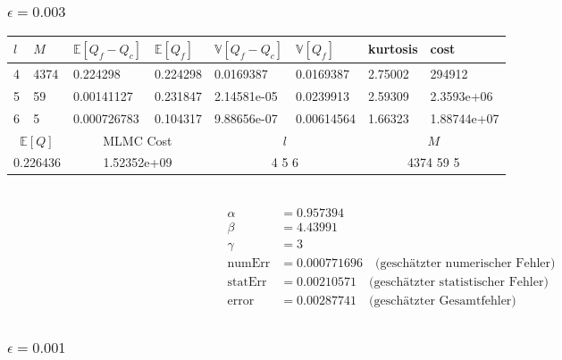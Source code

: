 \subsubsection{$ \epsilon=0.003 $}
\noindent\begin{tabular}{|p{0.15\q}|p{0.55\q}|p{1.4\q}|p{1.05\q}|p{1.35\q}|p{1.25\q}|p{0.9\q}|p{1.35\q}|}
	\hline
	$ l $   &  $ M $  &  $ \mathbb{E}[Q_f-Q_c] $  &   $ \mathbb{E}[Q_f] $ &  $ \mathbb{V}[Q_f-Q_c] $   &   $ \mathbb{V}[Q_f] $ &  kurtosis    &    cost\\
	\hline
	4 & 4374&    0.224298 &   0.224298&   0.0169387 &  0.0169387  &   2.75002 &     294912 \\
	5  &  59 & 0.00141127  &  0.231847 & 2.14581e-05 &  0.0239913  &   2.59309 & 2.3593e+06\\
	6   &  5  &0.000726783  &  0.104317 & 9.88656e-07 & 0.00614564  &   1.66323 &1.88744e+07\\
	\hline
	\multicolumn{2}{|c|}{$ \mathbb{E}[Q] $ }  &  \multicolumn{2}{c|}{MLMC Cost}   & \multicolumn{2}{c|}{$ l $}  &    \multicolumn{2}{c|}{$ M$} \\
	\hline
	\multicolumn{2}{|c|}{0.226436} & \multicolumn{2}{c|}{1.52352e+09  } &  \multicolumn{2}{c|}{   4 5 6 }     & \multicolumn{2}{c|}{4374 59 5}    \\
	\hline 
\end{tabular}\\

\begin{align*}
\alpha  &=    0.957394   \\
\beta   &=    4.43991   \\
\gamma  &=    3   \\
\text{numErr}  &= 0.000771696   \quad \text{(geschätzter numerischer Fehler)}\\
\text{statErr} &= 0.00210571  \quad  \text{(geschätzter statistischer Fehler)}\\
\text{error}   &= 0.00287741  \quad  \text{(geschätzter Gesamtfehler)}\\
\end{align*}


\subsubsection{$ \epsilon=0.001 $}

